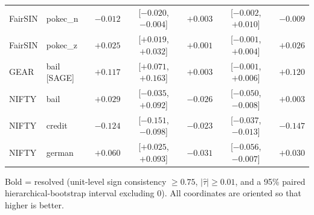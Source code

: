 \begin{table}[t]
\begin{tabular}{llrcrcr}
FairSIN & pokec\_n & $-0.012$ & [$-0.020$, $-0.004$] & $+0.003$ & [$-0.002$, $+0.010$] & $-0.009$ \\
FairSIN & pokec\_z & $+0.025$ & [$+0.019$, $+0.032$] & $+0.001$ & [$-0.001$, $+0.004$] & $+0.026$ \\
\midrule
GEAR & bail [SAGE] & $+0.117$ & [$+0.071$, $+0.163$] & $+0.003$ & [$-0.001$, $+0.006$] & $+0.120$ \\
\midrule
NIFTY & bail & $+0.029$ & [$-0.035$, $+0.092$] & $-0.026$ & [$-0.050$, $-0.008$] & $+0.003$ \\
NIFTY & credit & $-0.124$ & [$-0.151$, $-0.098$] & $\mathbf{-0.023}$ & [$-0.037$, $-0.013$] & $-0.147$ \\
NIFTY & german & $+0.060$ & [$+0.025$, $+0.093$] & $-0.031$ & [$-0.056$, $-0.007$] & $+0.030$ \\
\bottomrule
\end{tabular}
\par\smallskip\footnotesize Bold = resolved (unit-level sign consistency $\geq 0.75$, $|\hat\tau| \geq 0.01$, and a 95\% paired hierarchical-bootstrap interval excluding 0). All coordinates are oriented so that higher is better.
\end{table}
